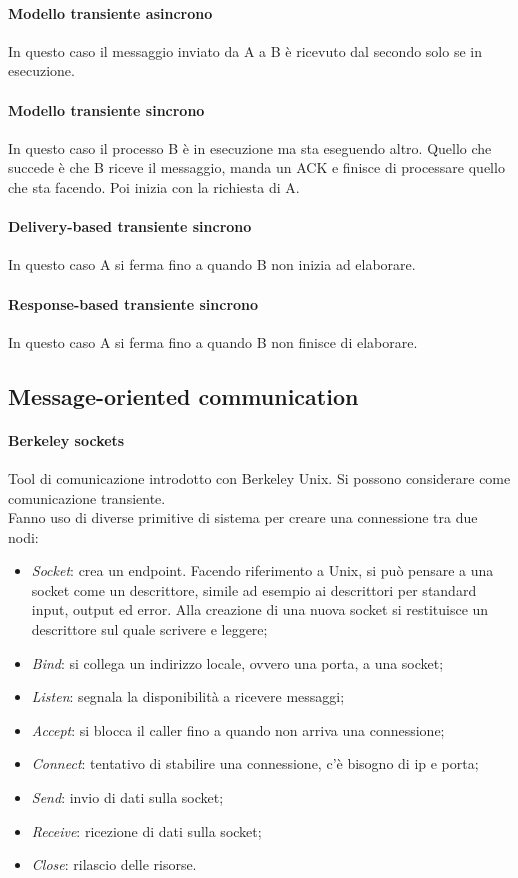 \paragraph{Modello transiente asincrono}
In questo caso il messaggio inviato da A a B è ricevuto dal secondo 
solo se in esecuzione.

\paragraph{Modello transiente sincrono}
In questo caso il processo B è in esecuzione ma sta eseguendo altro.
Quello che succede è che B riceve il messaggio, manda un ACK e finisce di 
processare quello che sta facendo. Poi inizia con la richiesta di A.

\paragraph{Delivery-based transiente sincrono}
In questo caso A si ferma fino a quando B non inizia ad elaborare.

\paragraph{Response-based transiente sincrono}
In questo caso A si ferma fino a quando B non finisce di elaborare.

\subsection{Message-oriented communication}

\paragraph{Berkeley sockets}
Tool di comunicazione introdotto con Berkeley Unix. Si possono 
considerare come comunicazione transiente.\\
Fanno uso di diverse primitive di sistema per creare una connessione
tra due nodi:
\begin{itemize}
    \item \emph{Socket}: crea un endpoint. Facendo riferimento 
    a Unix, si può pensare a una socket come 
    un descrittore, simile ad esempio ai descrittori per standard input,
    output ed error. Alla creazione di una nuova socket si restituisce un descrittore
    sul quale scrivere e leggere;
    \item \emph{Bind}: si collega un indirizzo locale, ovvero una porta, a una socket;
    \item \emph{Listen}: segnala la disponibilità a ricevere messaggi;
    \item \emph{Accept}: si blocca il caller fino a quando non arriva una connessione;
    \item \emph{Connect}: tentativo di stabilire una connessione, c'è bisogno di ip 
    e porta;
    \item \emph{Send}: invio di dati sulla socket;
    \item \emph{Receive}: ricezione di dati sulla socket;
    \item \emph{Close}: rilascio delle risorse.
\end{itemize}

